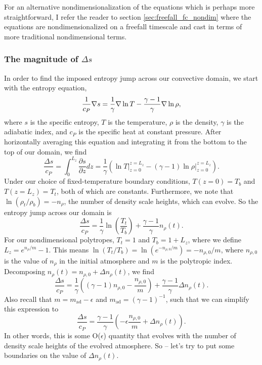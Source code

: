 For an alternative nondimensionalization of the equations which is perhaps more straightforward, I refer the reader to section \ref{sec:freefall_fc_nondim} where the equations are nondimensionalized on a freefall timescale and cast in terms of more traditional nondimensional terms.

\subsubsection{The magnitude of $\Delta s$}
In order to find the imposed entropy jump across our convective domain, we start with the entropy equation,
\begin{equation}
\frac{1}{c_P}\nabla s = \frac{1}{\gamma}\nabla\ln T - \frac{\gamma - 1}{\gamma}\nabla \ln \rho,
\end{equation}
where $s$ is the specific entropy, $T$ is the temperature, $\rho$ is the density, $\gamma$ is the adiabatic index, and $c_P$ is the specific heat at constant pressure.
After horizontally averaging this equation and integrating it from the bottom to the top of our domain, we find
$$
\frac{\Delta s}{c_P} = \int_0^{L_z} \frac{\partial s}{\partial z} dz = \frac{1}{\gamma}\left(\ln T\bigg|_{z=0}^{z=L_z} - (\gamma-1)\ln\rho\bigg|_{z=0}^{z=L_z}\right).
$$
Under our choice of fixed-temperature boundary conditions, $T(z=0) = T_b$ and $T(z=L_z) = T_t$, both of which are constants.
Furthermore, we note that $\ln(\rho_t/\rho_b) = -n_\rho$, the number of density scale heights, which can evolve.
So the entropy jump across our domain is
\begin{equation}
\frac{\Delta s}{c_P} = \frac{1}{\gamma}\ln\left(\frac{T_t}{T_b}\right) + \frac{\gamma-1}{\gamma} n_\rho(t).
\end{equation}
For our nondimensional polytropes, $T_t = 1$ and $T_b = 1 + L_z$, where we define $L_z = e^{n_\rho/m} - 1$.
This means $\ln (T_t/T_b) = \ln (e^{-n_{\rho,0}/m}) = -n_{\rho,0}/m$, where $n_{\rho,0}$ is the value of $n_\rho$ in the initial atmosphere and $m$ is the polytropic index.
Decomposing $n_\rho(t) = n_{\rho,0} + \Delta n_\rho(t)$, we find
\begin{equation}
\frac{\Delta s}{c_P} = \frac{1}{\gamma}\left((\gamma-1)n_{\rho,0} - \frac{n_{\rho,0}}{m}\right) + \frac{\gamma-1}{\gamma}\Delta n_\rho(t).
\end{equation}
Also recall that $m = m_{\text{ad}} - \epsilon$ and $m_{\text{ad}} = (\gamma-1)^{-1}$, such that we can simplify this expression to 
\begin{equation}
\frac{\Delta s}{c_P} = \frac{\gamma-1}{\gamma}\left( -\epsilon \frac{n_{\rho,0}}{m} + \Delta n_\rho(t)\right).
\label{eqn:deltaS_evolved}
\end{equation}
In other words, this is some O($\epsilon$) quantity that evolves with the number of density scale heights of the evolved atmosphere.
So -- let's try to put some boundaries on the value of $\Delta n_\rho(t)$.


